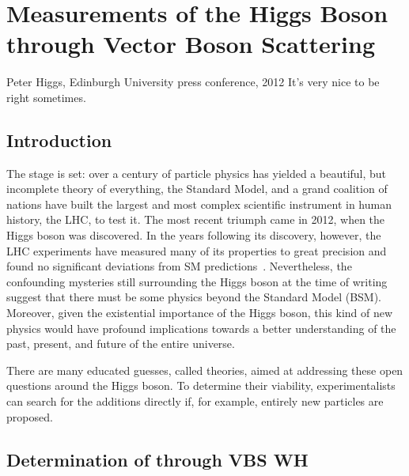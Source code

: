 \chapter{Measurements of the Higgs Boson through Vector Boson Scattering}
\begin{aquote}{Peter Higgs, Edinburgh University press conference, 2012}
    It's very nice to be right sometimes.
\end{aquote}
\section{Introduction}
The stage is set: over a century of particle physics has yielded a beautiful, but incomplete theory of everything, the Standard Model, and a grand coalition of nations have built the largest and most complex scientific instrument in human history, the LHC, to test it. 
The most recent triumph came in 2012, when the Higgs boson was discovered. 
In the years following its discovery, however, the LHC experiments have measured many of its properties to great precision and found no significant deviations from SM predictions~\cite{NatureHiggsCMS2022, NatureHiggsATLAS2022}. 
Nevertheless, the confounding mysteries still surrounding the Higgs boson at the time of writing suggest that there must be some physics beyond the Standard Model (BSM). 
Moreover, given the existential importance of the Higgs boson, this kind of new physics would have profound implications towards a better understanding of the past, present, and future of the entire universe. 

There are many educated guesses, called theories, aimed at addressing these open questions around the Higgs boson. 
To determine their viability, experimentalists can search for the additions directly if, for example, entirely new particles are proposed. 

\section{Determination of \lambdaWZ through VBS WH}
